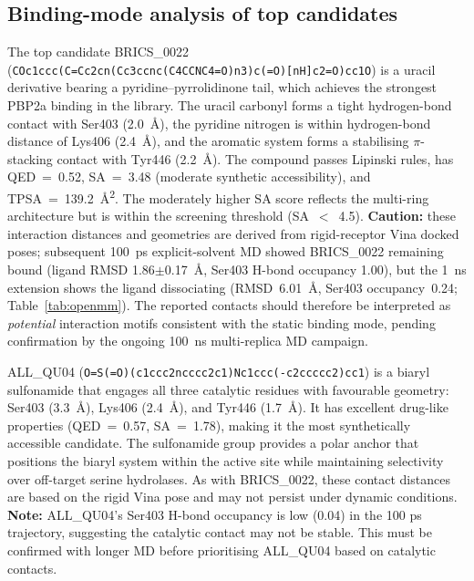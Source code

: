 \documentclass[12pt]{article}
\begin{document}
\subsection{Binding-mode analysis of top candidates}
The top candidate BRICS\_0022 (\texttt{COc1ccc(C=Cc2cn(Cc3ccnc(C4CCNC4=O)n3)c(=O)[nH]c2=O)cc1O}) is a uracil derivative bearing a pyridine--pyrrolidinone tail, which achieves the strongest PBP2a binding in the library. The uracil carbonyl forms a tight hydrogen-bond contact with Ser403 (\SI{2.0}{\angstrom}), the pyridine nitrogen is within hydrogen-bond distance of Lys406 (\SI{2.4}{\angstrom}), and the aromatic system forms a stabilising $\pi$-stacking contact with Tyr446 (\SI{2.2}{\angstrom}). The compound passes Lipinski rules, has QED~=~0.52, SA~=~3.48 (moderate synthetic accessibility), and TPSA~=~\SI{139.2}{\square\angstrom}. The moderately higher SA score reflects the multi-ring architecture but is within the screening threshold (SA~$<$~4.5). \textbf{Caution:} these interaction distances and geometries are derived from rigid-receptor Vina docked poses; subsequent 100~ps explicit-solvent MD showed BRICS\_0022 remaining bound (ligand RMSD 1.86$\pm$0.17~\si{\angstrom}, Ser403 H-bond occupancy 1.00), but the 1~ns extension shows the ligand dissociating (RMSD~6.01~\si{\angstrom}, Ser403 occupancy~0.24; Table~\ref{tab:openmm}). The reported contacts should therefore be interpreted as \emph{potential} interaction motifs consistent with the static binding mode, pending confirmation by the ongoing 100~ns multi-replica MD campaign.

ALL\_QU04 (\texttt{O=S(=O)(c1ccc2ncccc2c1)Nc1ccc(-c2ccccc2)cc1}) is a biaryl sulfonamide that engages all three catalytic residues with favourable geometry: Ser403 (\SI{3.3}{\angstrom}), Lys406 (\SI{2.4}{\angstrom}), and Tyr446 (\SI{1.7}{\angstrom}). It has excellent drug-like properties (QED~=~0.57, SA~=~1.78), making it the most synthetically accessible candidate. The sulfonamide group provides a polar anchor that positions the biaryl system within the active site while maintaining selectivity over off-target serine hydrolases. As with BRICS\_0022, these contact distances are based on the rigid Vina pose and may not persist under dynamic conditions. \textbf{Note:} ALL\_QU04's Ser403 H-bond occupancy is low (0.04) in the 100 ps trajectory, suggesting the catalytic contact may not be stable. This must be confirmed with longer MD before prioritising ALL\_QU04 based on catalytic contacts.
\end{document}
